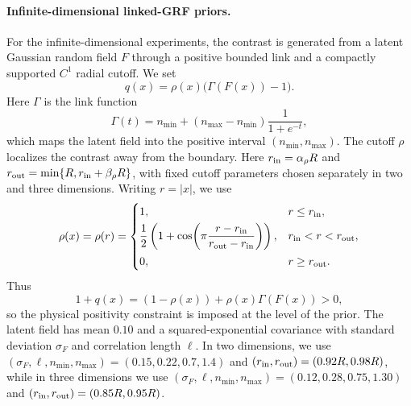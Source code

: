 \documentclass{article}
\numberwithin{equation}{section}
\theoremstyle{plain}
\begin{document}
\paragraph{Infinite-dimensional linked-GRF priors.}
For the infinite-dimensional experiments, the contrast is generated from a latent Gaussian random field $F$ through a positive bounded link and a compactly supported $C^1$ radial cutoff.  We set
\begin{equation}\label{eq:num_linked_grf_prior}
	q(x)=\rho(x)\bigl(\Gamma(F(x))-1\bigr).
\end{equation}
Here $\Gamma$ is the link function
\begin{equation}\label{eq:num_grf_link}
	\Gamma(t)=n_{\min}+(n_{\max}-n_{\min})\frac{1}{1+e^{-t}},
\end{equation}
which maps the latent field into the positive interval $(n_{\min},n_{\max})$.  The cutoff $\rho$ localizes the contrast away from the boundary.  Here $r_{\rm in}=\alpha_\rho R$ and
$r_{\rm out}=\min\{R,r_{\rm in}+\beta_\rho R\}$, with fixed
cutoff parameters chosen separately in two and three dimensions. Writing $r=|x|$, we use
\begin{equation}\label{eq:num_radial_cutoff}
	\rho(x)=\rho(r)=
	\begin{cases}
		1, & r\le r_{\rm in},\\[1mm]
		\dfrac12\left(1+\cos\!\left(\pi\dfrac{r-r_{\rm in}}{r_{\rm out}-r_{\rm in}}\right)\right),
		& r_{\rm in}<r<r_{\rm out},\\[3mm]
		0, & r\ge r_{\rm out}.
	\end{cases}
\end{equation}
Thus
\begin{equation*}
	1+q(x)=(1-\rho(x))+\rho(x)\Gamma(F(x))>0,
\end{equation*}
so the physical positivity constraint is imposed at the level of the prior.  The latent field has mean $0.10$ and a squared-exponential covariance with standard deviation $\sigma_F$ and correlation length $\ell$. In two dimensions, we use $(\sigma_F,\ell,n_{\min},n_{\max})=(0.15,0.22,0.7,1.4)$ and $(r_{\rm in},r_{\rm out})=(0.92R,0.98R)$, while in three dimensions we use $(\sigma_F,\ell,n_{\min},n_{\max})=(0.12,0.28,0.75,1.30)$ and $(r_{\rm in},r_{\rm out})=(0.85R,0.95R)$.
\end{document}
